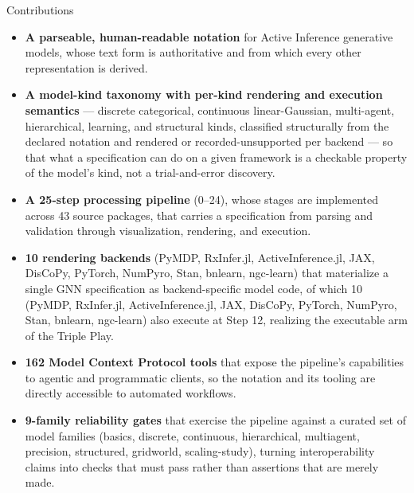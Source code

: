 \documentclass[
  ignorenonframetext,
]{beamer}
\providecommand{\tightlist}{%
  \setlength{\itemsep}{0pt}\setlength{\parskip}{0pt}}
\begin{document}
\begin{frame}[allowframebreaks]{Contributions}
\begin{itemize}
\tightlist
\item
  \textbf{A parseable, human-readable notation} for Active Inference
  generative models, whose text form is authoritative and from which
  every other representation is derived.
\item
  \textbf{A model-kind taxonomy with per-kind rendering and execution
  semantics} --- discrete categorical, continuous linear-Gaussian,
  multi-agent, hierarchical, learning, and structural kinds, classified
  structurally from the declared notation and rendered or
  recorded-unsupported per backend --- so that what a specification can
  do on a given framework is a checkable property of the model's kind,
  not a trial-and-error discovery.
\item
  \textbf{A 25-step processing pipeline} (0--24), whose stages are
  implemented across 43 source packages, that carries a specification
  from parsing and validation through visualization, rendering, and
  execution.
\item
  \textbf{10 rendering backends} (PyMDP, RxInfer.jl, ActiveInference.jl,
  JAX, DisCoPy, PyTorch, NumPyro, Stan, bnlearn, ngc-learn) that
  materialize a single GNN specification as backend-specific model code,
  of which 10 (PyMDP, RxInfer.jl, ActiveInference.jl, JAX, DisCoPy,
  PyTorch, NumPyro, Stan, bnlearn, ngc-learn) also execute at Step 12,
  realizing the executable arm of the Triple Play.
\item
  \textbf{162 Model Context Protocol tools} that expose the pipeline's
  capabilities to agentic and programmatic clients, so the notation and
  its tooling are directly accessible to automated workflows.
\item
  \textbf{9-family reliability gates} that exercise the pipeline against
  a curated set of model families (basics, discrete, continuous,
  hierarchical, multiagent, precision, structured, gridworld,
  scaling-study), turning interoperability claims into checks that must
  pass rather than assertions that are merely made.
\end{itemize}
\end{frame}
\end{document}
